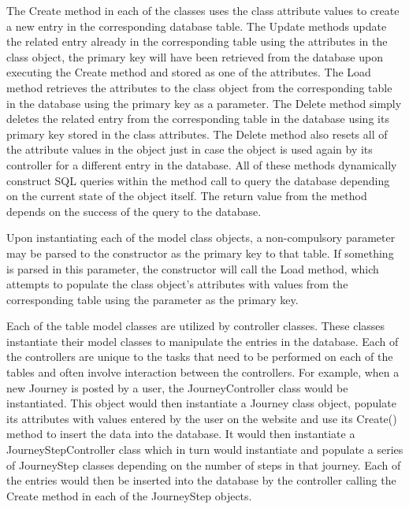The Create method in each of the classes uses the class attribute values to create a new entry in the corresponding database table. The Update methods update the related entry already in the corresponding table using the attributes in the class object, the primary key will have been retrieved from the database upon executing the Create method and stored as one of the attributes. The Load method retrieves the attributes to the class object from the corresponding table in the database using the primary key as a parameter. The Delete method simply deletes the related entry from the corresponding table in the database using its primary key stored in the class attributes. The Delete method also resets all of the attribute values in the object just in case the object is used again by its controller for a different entry in the database. All of these methods dynamically construct SQL queries within the method call to query the database depending on the current state of the object itself. The return value from the method depends on the success of the query to the database.
		
		Upon instantiating each of the model class objects, a non-compulsory parameter may be parsed to the constructor as the primary key to that table. If something is parsed in this parameter, the constructor will call the Load method, which attempts to populate the class object's attributes with values from the corresponding table using the parameter as the primary key.
		
		Each of the table model classes are utilized by controller classes. These classes instantiate their model classes to manipulate the entries in the database. Each of the controllers are unique to the tasks that need to be performed on each of the tables and often involve interaction between the controllers. For example, when a new Journey is posted by a user, the Journey\textunderscore Controller class would be instantiated. This object would then instantiate a Journey class object, populate its attributes with values entered by the user on the website and use its Create() method to insert the data into the database. It would then instantiate a Journey\textunderscore Step\textunderscore Controller class which in turn would instantiate and populate a series of Journey\textunderscore Step classes depending on the number of steps in that journey. Each of the entries would then be inserted into the database by the controller calling the Create method in each of the Journey\textunderscore Step objects. 	
				
